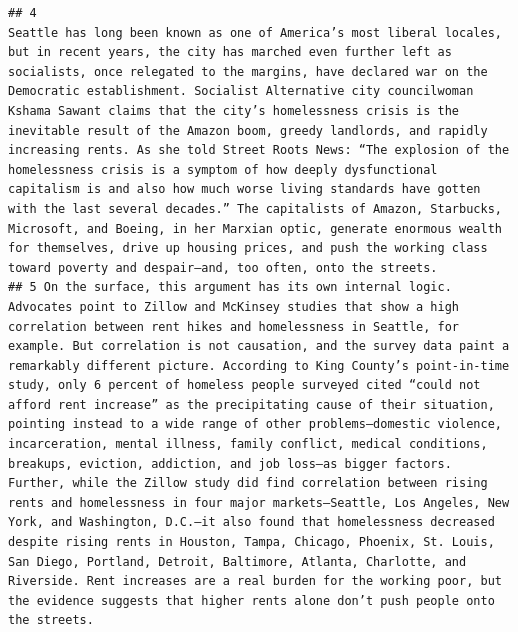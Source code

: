 \documentclass[
]{article}
\begin{document}
\begin{verbatim}
## 4                                                                                                                                                                                                                                                                                                     Seattle has long been known as one of America’s most liberal locales, but in recent years, the city has marched even further left as socialists, once relegated to the margins, have declared war on the Democratic establishment. Socialist Alternative city councilwoman Kshama Sawant claims that the city’s homelessness crisis is the inevitable result of the Amazon boom, greedy landlords, and rapidly increasing rents. As she told Street Roots News: “The explosion of the homelessness crisis is a symptom of how deeply dysfunctional capitalism is and also how much worse living standards have gotten with the last several decades.” The capitalists of Amazon, Starbucks, Microsoft, and Boeing, in her Marxian optic, generate enormous wealth for themselves, drive up housing prices, and push the working class toward poverty and despair—and, too often, onto the streets.
## 5 On the surface, this argument has its own internal logic. Advocates point to Zillow and McKinsey studies that show a high correlation between rent hikes and homelessness in Seattle, for example. But correlation is not causation, and the survey data paint a remarkably different picture. According to King County’s point-in-time study, only 6 percent of homeless people surveyed cited “could not afford rent increase” as the precipitating cause of their situation, pointing instead to a wide range of other problems—domestic violence, incarceration, mental illness, family conflict, medical conditions, breakups, eviction, addiction, and job loss—as bigger factors. Further, while the Zillow study did find correlation between rising rents and homelessness in four major markets—Seattle, Los Angeles, New York, and Washington, D.C.—it also found that homelessness decreased despite rising rents in Houston, Tampa, Chicago, Phoenix, St. Louis, San Diego, Portland, Detroit, Baltimore, Atlanta, Charlotte, and Riverside. Rent increases are a real burden for the working poor, but the evidence suggests that higher rents alone don’t push people onto the streets.

\end{verbatim}
\end{document}
